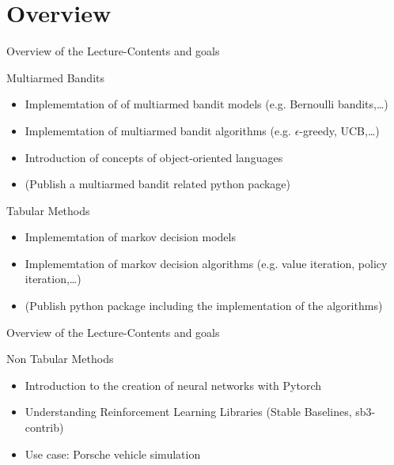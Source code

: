 \section{Overview}

\begin{frame}{Overview of the Lecture-Contents and goals}
    \begin{content}{Multiarmed Bandits}
        \begin{itemize}
            \item Implememtation of of multiarmed bandit models (e.g. Bernoulli bandits,\dots)
            \item Implememtation of multiarmed bandit algorithms (e.g. $\epsilon$-greedy, UCB,\dots)
            \item Introduction of concepts of object-oriented languages
            \item (Publish a multiarmed bandit related python package)
        \end{itemize}
    \end{content}
    \begin{content}{Tabular Methods}
        \begin{itemize}
            \item  Implememtation of markov decision models
            \item Implememtation of markov decision algorithms (e.g. value iteration, policy iteration,\dots)
            \item (Publish python package including the implementation of the algorithms)
        \end{itemize}
    \end{content}
\end{frame}
\begin{frame}{Overview of the Lecture-Contents and goals}
    \begin{content}{Non Tabular Methods}
        \begin{itemize}
            \item Introduction to the creation of neural networks with Pytorch
            \item Understanding Reinforcement Learning Libraries (Stable Baselines, sb3-contrib)
            \item Use case: Porsche vehicle simulation
        \end{itemize}
    \end{content}
\end{frame}